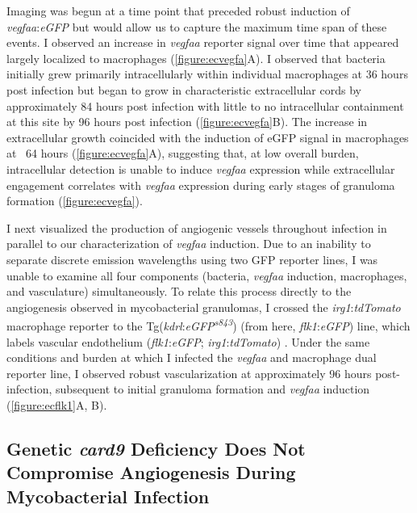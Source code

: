Imaging was begun at a time point that preceded robust induction of \textit{vegfaa}:\textit{eGFP} but would allow us to capture the maximum time span of these events. I observed an increase in \textit{vegfaa} reporter signal over time that appeared largely localized to macrophages (\autoref{figure:ecvegfa}A). I observed that bacteria initially grew primarily intracellularly within individual macrophages at 36 hours post infection but began to grow in characteristic extracellular cords by approximately 84 hours post infection with little to no intracellular containment at this site by 96 hours post infection (\autoref{figure:ecvegfa}B). The increase in extracellular growth coincided with the induction of eGFP signal in macrophages at ~64 hours (\autoref{figure:ecvegfa}A), suggesting that, at low overall burden, intracellular detection is unable to induce \textit{vegfaa} expression while extracellular engagement correlates with \textit{vegfaa} expression during early stages of granuloma formation (\autoref{figure:ecvegfa}). 

I next visualized the production of angiogenic vessels throughout infection in parallel to our characterization of \textit{vegfaa} induction. Due to an inability to separate discrete emission wavelengths using two GFP reporter lines, I was unable to examine all four components (bacteria, \textit{vegfaa} induction, macrophages, and vasculature) simultaneously. To relate this process directly to the angiogenesis observed in mycobacterial granulomas, I crossed the \textit{irg1}:\textit{tdTomato} macrophage reporter to the Tg(\textit{kdrl}:\textit{eGFP\textsuperscript{s843}}) (from here, \textit{flk1}:\textit{eGFP}) line, which labels vascular endothelium (\textit{flk1}:\textit{eGFP}; \textit{irg1}:\textit{tdTomato}) \citep{Jin2005}. Under the same conditions and burden at which I infected the \textit{vegfaa} and macrophage dual reporter line, I observed robust vascularization at approximately 96 hours post\hyp{}infection, subsequent to initial granuloma formation and \textit{vegfaa} induction (\autoref{figure:ecflk1}A, B). 

\subsection{Genetic \textit{card9} Deficiency Does Not Compromise Angiogenesis During Mycobacterial Infection}

